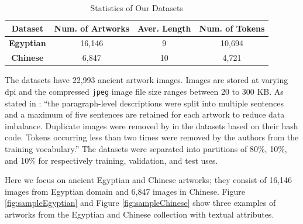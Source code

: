 \begin{table}[h!]
\centering
\begin{tabular}{|c|c|c|c|}
\hline
\textbf{Dataset}          & \textbf{Num. of Artworks} & \textbf{Aver. Length} & \textbf{Num. of Tokens} \\ \hline
\textbf{Egyptian} & 16,146                       & 9                       & 10,694                     \\ \hline
\textbf{Chinese}  & 6,847                        & 10                      & 4,721                      \\ \hline
\end{tabular}
\caption{Statistics of Our Datasets \cite{artworkcaption}}
\label{fig:datasetstats}
\end{table}

The datasets have 22,993 ancient artwork images. Images are stored at varying dpi and the
compressed \verb|jpeg| image file size ranges between 20 to 300 KB. As stated in \cite{artworkcaption}: ``the paragraph-level descriptions were split into multiple sentences and a maximum of five sentences are retained for each artwork to reduce data imbalance. Duplicate images were removed by \cite{artworkcaption} in the datasets based on their hash code. Tokens occurring less than two times were removed by the authors from the training vocabulary.''
The datasets were separated into partitions of 80\%, 10\%, and 10\% for respectively training, validation, and test uses.


Here we focus on ancient Egyptian and Chinese artworks; 
they consist of 16,146 images from Egyptian domain and 6,847 images in Chinese. Figure \ref{fig:sampleEgyptian} and Figure \ref{fig:sampleChinese} show three examples of artworks from the Egyptian and Chinese collection with textual attributes.

